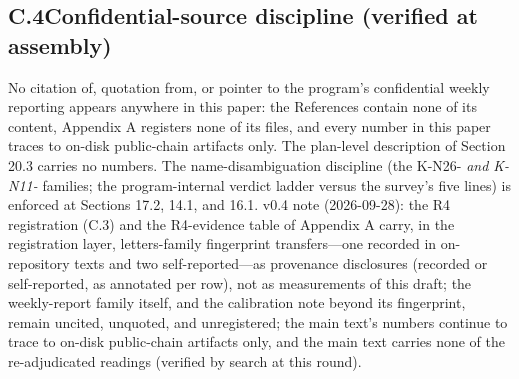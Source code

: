 \documentclass[11pt]{article}
\begin{document}
\subsection*{C.4\quad Confidential-source discipline (verified at assembly)}
\noindent No citation of, quotation from, or pointer to the program's confidential weekly reporting appears anywhere in this paper: the References contain none of its content, Appendix A registers none of its files, and every number in this paper traces to on-disk public-chain artifacts only. The plan-level description of Section 20.3 carries no numbers. The name-disambiguation discipline (the K-N26-\emph{ and K-N11-} families; the program-internal verdict ladder versus the survey's five lines) is enforced at Sections 17.2, 14.1, and 16.1. v0.4 note (2026-09-28): the R4 registration (C.3) and the R4-evidence table of Appendix A carry, in the registration layer, letters-family fingerprint transfers—one recorded in on-repository texts and two self-reported—as provenance disclosures (recorded or self-reported, as annotated per row), not as measurements of this draft; the weekly-report family itself, and the calibration note beyond its fingerprint, remain uncited, unquoted, and unregistered; the main text's numbers continue to trace to on-disk public-chain artifacts only, and the main text carries none of the re-adjudicated readings (verified by search at this round).\par
\end{document}
